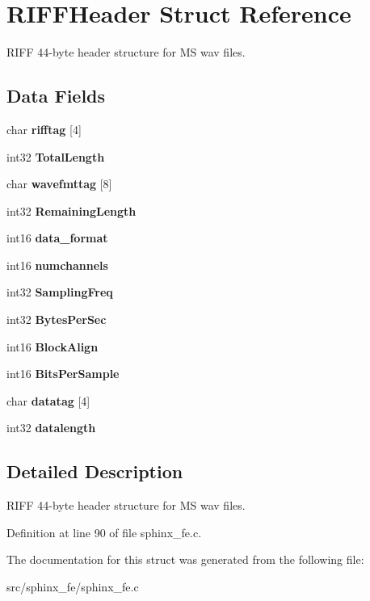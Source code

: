 \section{RIFFHeader Struct Reference}
\label{structRIFFHeader}
RIFF 44-byte header structure for MS wav files.  


\subsection*{Data Fields}
\begin{CompactItemize}
\item 
char \textbf{rifftag} [4]\label{structRIFFHeader_41ad222f7a391957baebb72b520ca313}

\item 
int32 \textbf{TotalLength}\label{structRIFFHeader_0432c23ba2c7421bc1a918e813e89b74}

\item 
char \textbf{wavefmttag} [8]\label{structRIFFHeader_b02082cd826cc18e14bf1509936d96d6}

\item 
int32 \textbf{RemainingLength}\label{structRIFFHeader_4f124bd29a8d7a36de8281d2bc836353}

\item 
int16 \textbf{data\_\-format}\label{structRIFFHeader_6d51315afb5ee7c17ec42fed06ef72df}

\item 
int16 \textbf{numchannels}\label{structRIFFHeader_b639e289d0009f82f7860edd8e324daf}

\item 
int32 \textbf{SamplingFreq}\label{structRIFFHeader_7723e76cc1ff383b0f4f7a053f43d31f}

\item 
int32 \textbf{BytesPerSec}\label{structRIFFHeader_003ffd3a4cc8cd55c7b4031723c5bac1}

\item 
int16 \textbf{BlockAlign}\label{structRIFFHeader_88c8a1a0cc69b955eada53fd28078497}

\item 
int16 \textbf{BitsPerSample}\label{structRIFFHeader_d7a6f7b03f79a574ba5edd47e9a3451c}

\item 
char \textbf{datatag} [4]\label{structRIFFHeader_d8c58fa74d6d52637aa6f674a3a9482d}

\item 
int32 \textbf{datalength}\label{structRIFFHeader_8900896018b1277439d20d824d8c3aba}

\end{CompactItemize}


\subsection{Detailed Description}
RIFF 44-byte header structure for MS wav files. 



Definition at line 90 of file sphinx\_\-fe.c.

The documentation for this struct was generated from the following file:\begin{CompactItemize}
\item 
src/sphinx\_\-fe/sphinx\_\-fe.c\end{CompactItemize}

